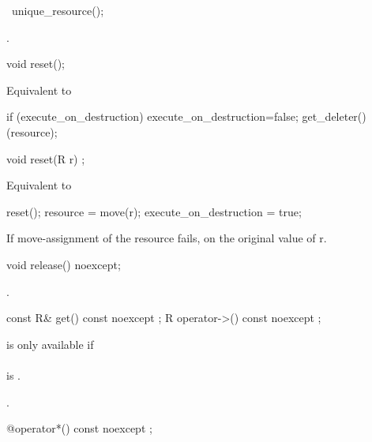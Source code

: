 \documentclass[ebook,11pt,article]{memoir}
\begin{document}
\begin{itemdecl}
~unique_resource();
\end{itemdecl}

\pnum
\effects {}.

\begin{itemdecl}
void reset();
\end{itemdecl}

\pnum
\effects Equivalent to
\begin{codeblock}
  if (execute_on_destruction) {
    execute_on_destruction=false;
    get_deleter()(resource);
  }
\end{codeblock}

\begin{itemdecl}
void reset(R r) ;
\end{itemdecl}

\pnum
\effects Equivalent to
\begin{codeblock}
  reset();
  resource = move(r);
  execute_on_destruction = true;
\end{codeblock}
If move-assignment of the resource fails,  on the original value of r.


\begin{itemdecl}
void release() noexcept;
\end{itemdecl}

\pnum
\effects {}.


\begin{itemdecl}
const R& get() const noexcept ;
R operator->() const noexcept ;
\end{itemdecl}

\pnum
\requires 
{} is only available if \\
\\ is . 

\pnum
\returns {}.

\begin{itemdecl}
@\seebelow@ operator*() const noexcept ;
\end{itemdecl}
\end{document}

